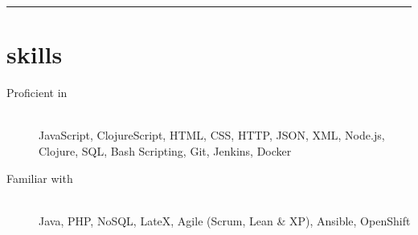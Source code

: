 \begin{samepage}
  \hrule
  \section*{skills}
\end{samepage}


\begin{description}
\item[Proficient in] \hfill \\ JavaScript, ClojureScript, HTML, CSS, HTTP, JSON,
  XML, Node.js, Clojure, SQL, Bash Scripting, Git, Jenkins, Docker
\item[Familiar with] \hfill \\ Java, PHP, NoSQL, LateX, Agile (Scrum, Lean \&
  XP), Ansible, OpenShift
\end{description}
\vspace{1em}
